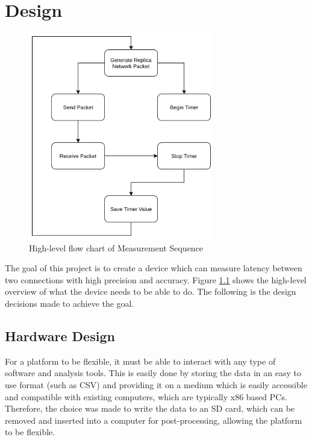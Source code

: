 \chapter{Design}\label{C:design}

\vspace{-3mm}

\begin{figure}[H]
    \begin{center}
        \includegraphics[keepaspectratio,width=8cm]{Images/MeasurementSequence}
        \caption{High-level flow chart of Measurement Sequence}
        \label{fig:measurementsequence}
    \end{center}
\end{figure}


The goal of this project is to create a device which can measure latency between two connections with high precision
and accuracy. Figure \ref{fig:measurementsequence} shows the high-level overview of what the device needs to be able 
to do. The following is the design decisions made to achieve the goal.

\section{Hardware Design}

For a platform to be flexible, it must be able to interact with any type of software and analysis tools. This is 
easily done by storing the data in an easy to use format (such as CSV) and providing it on a medium which is 
easily accessible and compatible with existing computers, which are typically x86 based PCs. Therefore, the choice 
was made to write the data to an SD card, which can be removed and inserted into a computer for post-processing, 
allowing the platform to be flexible. 

